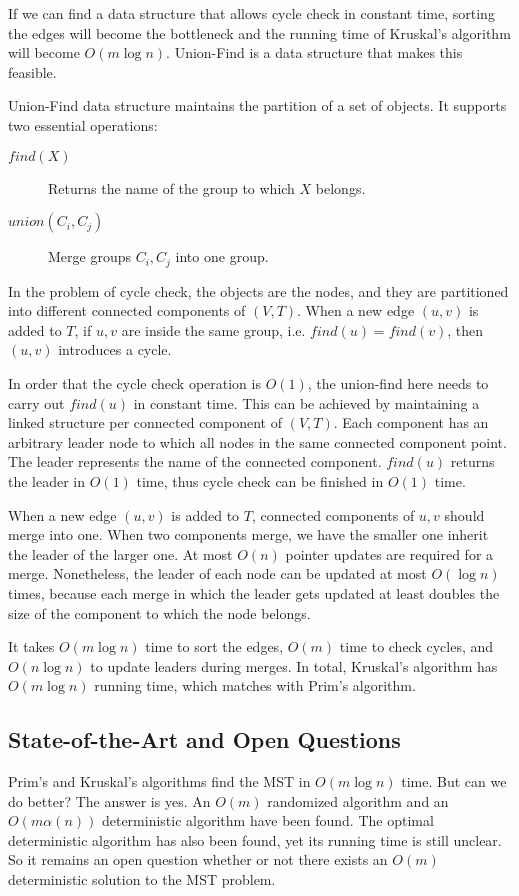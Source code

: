 If we can find a data structure that allows cycle check in constant time, sorting the edges will become the bottleneck and the running time of Kruskal's algorithm will become $O(m\log n)$. Union-Find is a data structure that makes this feasible.

Union-Find data structure maintains the partition of a set of objects. It supports two essential operations:
\begin{description}
\item[$find(X)$]Returns the name of the group to which $X$ belongs.
\item[$union(C_i, C_j)$]Merge groups $C_i,C_j$ into one group.
\end{description} 
In the problem of cycle check, the objects are the nodes, and they are partitioned into different connected components of $(V,T)$. When a new edge $(u,v)$ is added to $T$, if $u,v$ are inside the same group, i.e. $find(u)=find(v)$, then $(u,v)$ introduces a cycle. 

In order that the cycle check operation is $O(1)$, the union-find here needs to carry out $find(u)$ in constant time. This can be achieved by maintaining a linked structure per connected component of $(V,T)$. Each component has an arbitrary leader node to which all nodes in the same connected component point. The leader represents the name of the connected component. $find(u)$ returns the leader in $O(1)$ time, thus cycle check can be finished in $O(1)$ time. 

When a new edge $(u,v)$ is added to $T$, connected components of $u,v$ should merge into one. When two components merge, we have the smaller one inherit the leader of the larger one. At most $O(n)$ pointer updates are required for a merge. Nonetheless, the leader of each node can be updated at most $O(\log n)$ times, because each merge in which the leader gets updated at least doubles the size of the component to which the node belongs. 

It takes $O(m\log n)$ time to sort the edges, $O(m)$ time to check cycles, and $O(n\log n)$ to update leaders during merges. In total, Kruskal's algorithm has $O(m\log n)$ running time, which matches with Prim's algorithm.
\subsection{State-of-the-Art and Open Questions}
Prim's and Kruskal's algorithms find the MST in $O(m\log n)$ time. But can we do better? The answer is yes. An $O(m)$ randomized algorithm and an $O(m\alpha(n))$ deterministic algorithm have been found. The optimal deterministic algorithm has also been found, yet its running time is still unclear. So it remains an open question whether or not there exists an $O(m)$ deterministic solution to the MST problem.
